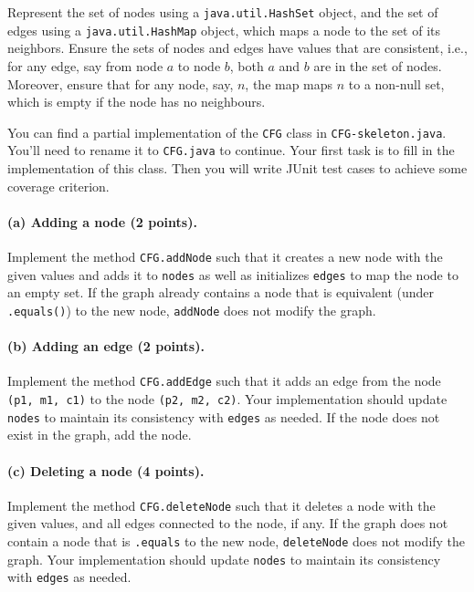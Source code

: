 \documentclass[10pt]{article}
\begin{document}
{Represent the set of nodes using a {\tt java.util.HashSet} object, and
the set of edges using a {\tt java.util.HashMap} object, which maps a
node to the set of its neighbors. Ensure the sets of nodes and edges
have values that are consistent, i.e., for any edge, say from node $a$
to node $b$, both $a$ and $b$ are in the set of nodes. Moreover, ensure
that for any node, say, $n$, the map maps $n$ to a non-null set,
which is empty if the node has no neighbours.

You can find a partial implementation of the {\tt CFG} class in {\tt CFG-skeleton.java}. 
You'll need to rename it to {\tt CFG.java} to continue. Your first task is to
fill in the implementation of this class. Then you will write JUnit test cases to achieve some coverage criterion. 

\paragraph{(a) Adding a node (2 points).}
Implement the method {\tt CFG.addNode} such that it creates a new node
with the given values and adds it to {\tt nodes} as well as initializes
{\tt edges} to map the node to an empty set. If the graph already contains a
node that is equivalent (under {\tt .equals()}) to the new node, {\tt addNode} does not
modify the graph.

\paragraph{(b) Adding an edge (2 points).}
Implement the method {\tt CFG.addEdge} such that it adds an edge from
the node {\tt (p1, m1, c1)} to the node {\tt (p2, m2, c2)}.  
Your implementation should update {\tt nodes} to maintain its consistency with {\tt edges} as needed.  
If the node does not exist in the graph, add the node. 

\paragraph{(c) Deleting a node (4 points).}
Implement the method {\tt CFG.deleteNode} such that it deletes a node
with the given values, and all edges connected to the node, if any.  
If the graph does not contain a
node that is {\tt .equals} to the new node, {\tt deleteNode} does not
modify the graph.
Your implementation should update {\tt nodes} to maintain its consistency with
{\tt edges} as needed.


}
\end{document}
